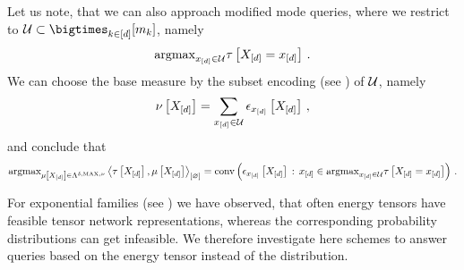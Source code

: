 Let us note, that we can also approach modified mode queries, where we restrict to $\arbset\subset\facstates$, namely
\begin{align*}
    \mathrm{argmax}_{x_{[d]}\in\mathcal{U}} \tau\left[X_{[d]}=x_{[d]}\right] \, .
\end{align*}
We can choose the base measure by the subset encoding (see ) of $\mathcal{U}$, namely
\begin{align*}
    \nu\left[X_{[d]}\right] = \sum_{x_{[d]}\in\mathcal{U}} \epsilon_{x_{[d]}}\left[X_{[d]}\right] \, ,
\end{align*}
and conclude that
\begin{align*}
    \mathrm{argmax}_{\mu\left[X_{[d]}\right]\in\Lambda^{\delta,\mathrm{MAX},\nu}} \left\langle \tau\left[X_{[d]}\right],\mu\left[X_{[d]}\right]\right\rangle_{\left[ \varnothing \right]}
    = \mathrm{conv}\left(\epsilon_{x_{[d]}}\left[X_{[d]}\right] \,:\, x_{[d]}\in\mathrm{argmax}_{x_{[d]}\in\mathcal{U}} \tau\left[X_{[d]}=x_{[d]}\right]\right) \, .
\end{align*}




For exponential families (see ) we have observed, that often energy tensors have feasible tensor network representations, whereas the corresponding probability distributions can get infeasible.
We therefore investigate here schemes to answer queries based on the energy tensor instead of the distribution.

